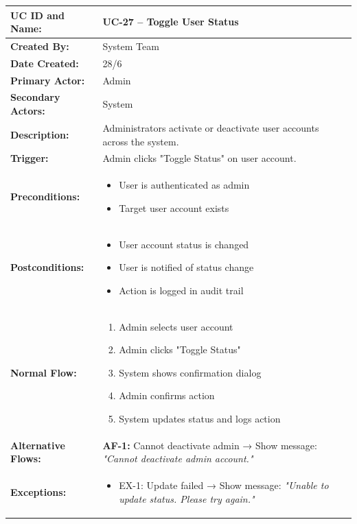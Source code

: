 \documentclass[12pt,a4paper]{article}
\begin{document}
\renewcommand{\arraystretch}{1.5}
\begin{longtable}{|p{4.5cm}|p{10.5cm}|}
\hline
\textbf{UC ID and Name:} & UC-27 – Toggle User Status \\
\hline
\textbf{Created By:} & System Team \\
\hline
\textbf{Date Created:} & 28/6 \\
\hline
\textbf{Primary Actor:} & Admin \\
\hline
\textbf{Secondary Actors:} & System \\
\hline
\textbf{Description:} & Administrators activate or deactivate user accounts across the system. \\
\hline
\textbf{Trigger:} & Admin clicks "Toggle Status" on user account. \\
\hline
\textbf{Preconditions:} &
\begin{itemize}
  \item User is authenticated as admin
  \item Target user account exists
\end{itemize} \\
\hline
\textbf{Postconditions:} &
\begin{itemize}
  \item User account status is changed
  \item User is notified of status change
  \item Action is logged in audit trail
\end{itemize} \\
\hline
\textbf{Normal Flow:} &
\begin{enumerate}
  \item Admin selects user account
  \item Admin clicks "Toggle Status"
  \item System shows confirmation dialog
  \item Admin confirms action
  \item System updates status and logs action
\end{enumerate} \\
\hline
\textbf{Alternative Flows:} &
\textbf{AF-1:} Cannot deactivate admin → Show message: \textit{"Cannot deactivate admin account."} \\
\hline
\textbf{Exceptions:} &
\begin{itemize}
  \item EX-1: Update failed → Show message: \textit{"Unable to update status. Please try again."}
\end{itemize} \\

\end{longtable}
\end{document}
